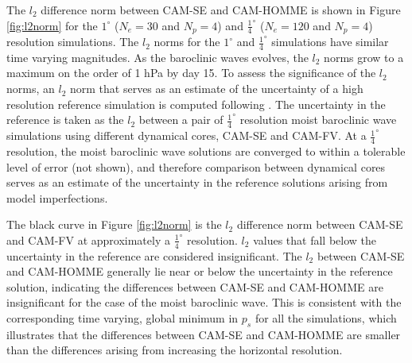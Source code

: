 \documentclass{agujournal}
\begin{document}
{The $l_2$ difference norm between CAM-SE and CAM-HOMME is shown in Figure \ref{fig:l2norm} for the $1^{\circ}$ ($N_e=30$ and $N_p=4$) and $\frac{1}{4}^{\circ}$ ($N_e=120$ and $N_p=4$) resolution simulations. The $l_2$ norms for the $1^{\circ}$ and $\frac{1}{4}^{\circ}$ simulations have similar time varying magnitudes. As the baroclinic waves evolves, the $l_2$ norms grow to a maximum on the order of 1 hPa by day 15. To assess the significance of the $l_2$ norms, an $l_2$ norm that serves as an estimate of the uncertainty of a high resolution reference simulation is computed following \cite{JW2006QJR}. The uncertainty in the reference is taken as the $l_2$ between a pair of $\frac{1}{4}^{\circ}$ resolution moist baroclinic wave simulations using different dynamical cores, CAM-SE and CAM-FV. At a $\frac{1}{4}^{\circ}$ resolution, the moist baroclinic wave solutions are converged to within a tolerable level of error (not shown), and therefore comparison between dynamical cores serves as an estimate of the uncertainty in the reference solutions arising from model imperfections. 

The black curve in Figure \ref{fig:l2norm} is the $l_2$ difference norm between CAM-SE and CAM-FV at approximately a $\frac{1}{4}^{\circ}$ resolution. $l_2$ values that fall below the uncertainty in the reference are considered insignificant. The $l_2$ between CAM-SE and CAM-HOMME generally lie near or below the uncertainty in the reference solution, indicating the differences between CAM-SE and CAM-HOMME are insignificant for the case of the moist baroclinic wave. This is consistent with the corresponding time varying, global minimum in $p_s$ for all the simulations, which illustrates that the differences between CAM-SE and CAM-HOMME are smaller than the differences arising from increasing the horizontal resolution.

}
\end{document}
